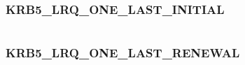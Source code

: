 \documentclass[letterpaper,10pt,english]{sphinxmanual}
\begin{document}
\begin{fulllineitems}
\label{appdev/refs/macros/KRB5_LRQ_ONE_ACCT_EXPTIME:KRB5_LRQ_ONE_ACCT_EXPTIME}
\end{fulllineitems}


\begin{tabulary}{\linewidth}{|L|L|}
\hline

 & 
\\
\hline\end{tabulary}



\subsubsection{KRB5\_LRQ\_ONE\_LAST\_INITIAL}
\label{appdev/refs/macros/KRB5_LRQ_ONE_LAST_INITIAL:krb5-lrq-one-last-initial-data}\label{appdev/refs/macros/KRB5_LRQ_ONE_LAST_INITIAL::doc}\label{appdev/refs/macros/KRB5_LRQ_ONE_LAST_INITIAL:krb5-lrq-one-last-initial}

\begin{fulllineitems}
\label{appdev/refs/macros/KRB5_LRQ_ONE_LAST_INITIAL:KRB5_LRQ_ONE_LAST_INITIAL}
\end{fulllineitems}


\begin{tabulary}{\linewidth}{|L|L|}
\hline

 & 
\\
\hline\end{tabulary}



\subsubsection{KRB5\_LRQ\_ONE\_LAST\_RENEWAL}
\label{appdev/refs/macros/KRB5_LRQ_ONE_LAST_RENEWAL:krb5-lrq-one-last-renewal-data}\label{appdev/refs/macros/KRB5_LRQ_ONE_LAST_RENEWAL::doc}\label{appdev/refs/macros/KRB5_LRQ_ONE_LAST_RENEWAL:krb5-lrq-one-last-renewal}

\begin{fulllineitems}
\label{appdev/refs/macros/KRB5_LRQ_ONE_LAST_RENEWAL:KRB5_LRQ_ONE_LAST_RENEWAL}
\end{fulllineitems}
\end{document}
